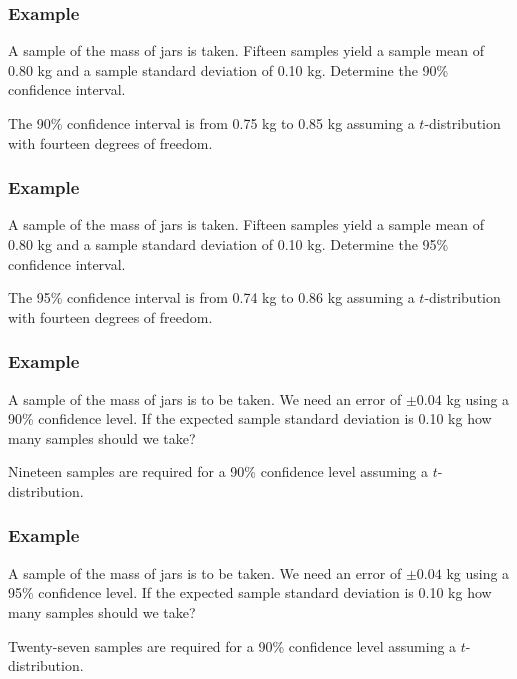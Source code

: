 \begin{frame}
  \frametitle{Example}

  A sample of the mass of jars is taken. Fifteen samples yield a
  sample mean of 0.80 kg and a sample standard deviation of 0.10
  kg. Determine the 90\% confidence interval.

  \vfill

  {

    The 90\% confidence interval is from 0.75 kg to 0.85 kg
    assuming a $t$-distribution with fourteen degrees of freedom.

  }

  \vfill

\end{frame}

\begin{frame}
  \frametitle{Example}

  A sample of the mass of jars is taken. Fifteen samples yield a
  sample mean of 0.80 kg and a sample standard deviation of 0.10
  kg. Determine the 95\% confidence interval.

  \vfill

  {

    The 95\% confidence interval is from 0.74 kg to 0.86 kg
    assuming a $t$-distribution with fourteen degrees of freedom.

  }

  \vfill

\end{frame}

\begin{frame}
  \frametitle{Example}

  A sample of the mass of jars is to be taken. We need an error of
  $\pm 0.04$ kg using a 90\% confidence level. If the expected sample
  standard deviation is 0.10 kg how many samples should we take?

  \vfill

  {

    Nineteen samples are required for a 90\% confidence level assuming
    a $t$-distribution.

  }

  \vfill

\end{frame}

\begin{frame}
  \frametitle{Example}

  A sample of the mass of jars is to be taken. We need an error of
  $\pm 0.04$ kg using a 95\% confidence level. If the expected sample
  standard deviation is 0.10 kg how many samples should we take?

  \vfill

  {

    Twenty-seven samples are required for a 90\% confidence level
    assuming a $t$-distribution.

  }

  \vfill

\end{frame}


